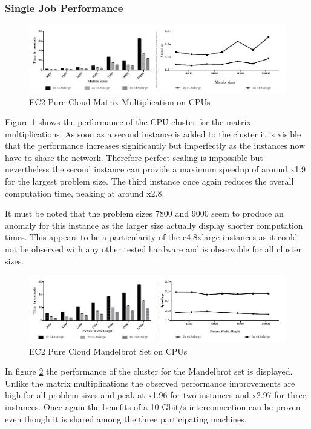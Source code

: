 \subsubsection*{Single Job Performance}
\begin{figure}[!htb]
	\includegraphics[width=1.0\textwidth]{images/ec2_cpu_matrix_multiplication.pdf}
	\centering
	\caption{EC2 Pure Cloud Matrix Multiplication on CPUs}
	\label{img:ec2_cpu_matrix_multiplication}
\end{figure}

Figure \ref{img:ec2_cpu_matrix_multiplication} shows the performance of the CPU cluster for the matrix multiplications. As soon as a second instance is added to the cluster it is visible that the performance increases significantly but imperfectly as the instances now have to share the network. Therefore perfect scaling is impossible but nevertheless the second instance can provide a maximum speedup of around x1.9 for the largest problem size. The third instance once again reduces the overall computation time, peaking at around x2.8.

It must be noted that the problem sizes 7800 and 9000 seem to produce an anomaly for this instance as the larger size actually display shorter computation times. This appears to be a particularity of the c4.8xlarge instances as it could not be observed with any other tested hardware and is observable for all cluster sizes.


\begin{figure}[!htb]
	\includegraphics[width=1.0\textwidth]{images/ec2_cpu_mandelbrot.pdf}
	\centering
	\caption{EC2 Pure Cloud Mandelbrot Set on CPUs}
	\label{img:ec2_cpu_mandelbrot}
\end{figure}

In figure \ref{img:ec2_cpu_mandelbrot} the performance of the cluster for the Mandelbrot set is displayed. Unlike the matrix multiplications the observed performance improvements are high for all problem sizes and peak at x1.96 for two instances and x2.97 for three instances. Once again the benefits of a 10 Gbit/s interconnection can be proven even though it is shared among the three participating machines.
